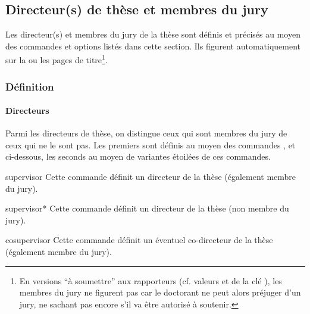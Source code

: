 \subsection{Directeur(s) de thèse et membres du jury}\label{sec:jury}

Les directeur(s) et membres du jury de la thèse sont définis et précisés au
moyen des commandes et options listés dans cette section. Ils figurent
automatiquement sur la ou les pages de titre\footnote{En versions \enquote{à
    soumettre} aux rapporteurs (cf. valeurs \protect{} et
  \protect{} de la clé \protect{}), les
  membres du jury ne figurent pas car le doctorant ne peut alors préjuger d'un
  jury, ne sachant pas encore s'il va être autorisé à soutenir.}.

\subsubsection{Définition}\label{sec:definition-directeurs-jury}

\paragraph{Directeurs}\label{sec:definition-directeurs}

Parmi les directeurs de thèse, on distingue ceux qui sont membres du jury de
ceux qui ne le sont pas. Les premiers sont définis au moyen des commandes
,  et  ci-dessous,
les seconds au moyen de variantes étoilées de ces commandes.

\begin{docCommand}[doc
  description=\mandatory]{supervisor}{}
  Cette commande définit un directeur de la thèse (également membre du jury).
\end{docCommand}

\begin{docCommand}[doc description=\mandatory]{supervisor*}{}
  Cette commande définit un directeur de la thèse (non membre du jury).
\end{docCommand}

\begin{docCommand}{cosupervisor}{}
  Cette commande définit un éventuel co-directeur de la thèse (également membre du jury).
\end{docCommand}

